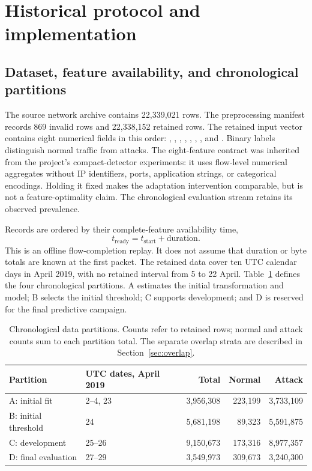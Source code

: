 \section{Historical protocol and implementation}
\subsection{Dataset, feature availability, and chronological partitions}
The source network archive contains 22,339,021 rows. The preprocessing manifest records 869 invalid rows and 22,338,152 retained rows. The retained input vector contains eight numerical fields in this order: , , , , , , , and . Binary labels distinguish normal traffic from attacks. The eight-feature contract was inherited from the project's compact-detector experiments: it uses flow-level numerical aggregates without IP identifiers, ports, application strings, or categorical encodings. Holding it fixed makes the adaptation intervention comparable, but is not a feature-optimality claim. The chronological evaluation stream retains its observed prevalence.

Records are ordered by their complete-feature availability time,
\begin{equation}
 t_{\mathrm{ready}}=t_{\mathrm{start}}+\mathrm{duration}.
 \label{eq:ready}
\end{equation}
This is an offline flow-completion replay. It does not assume that duration or byte totals are known at the first packet. The retained data cover ten UTC calendar days in April 2019, with no retained interval from 5 to 22 April. Table~\ref{tab:data} defines the four chronological partitions. A estimates the initial transformation and model; B selects the initial threshold; C supports development; and D is reserved for the final predictive campaign.

\begin{table}[tb]
\centering\small
\caption{Chronological data partitions. Counts refer to retained rows; normal and attack counts sum to each partition total. The separate overlap strata are described in Section~\ref{sec:overlap}.}
\label{tab:data}
\begin{tabular}{llrrr}
\toprule
Partition & UTC dates, April 2019 & Total & Normal & Attack \\
\midrule
A: initial fit & 2--4, 23 & 3,956,308 & 223,199 & 3,733,109 \\
B: initial threshold & 24 & 5,681,198 & 89,323 & 5,591,875 \\
C: development & 25--26 & 9,150,673 & 173,316 & 8,977,357 \\
D: final evaluation & 27--29 & 3,549,973 & 309,673 & 3,240,300 \\
\bottomrule
\end{tabular}
\end{table}

